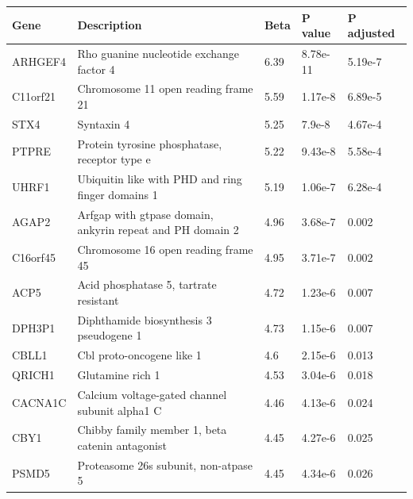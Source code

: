 \documentclass[10pt]{article}
\begin{document}
\begin{table}[]
\begin{tabular}{p{1.8cm}p{6.8cm}C{1cm}C{1.3cm}C{1.7cm}}
Gene     & Description                                                & Beta & P value & P adjusted \\
\hline
ARHGEF4  & Rho guanine nucleotide exchange factor 4                   & 6.39          & 8.78e-11      & 5.19e-7        \\
C11orf21 & Chromosome 11 open reading frame 21                        & 5.59          & 1.17e-8       & 6.89e-5        \\
STX4     & Syntaxin 4                                                 & 5.25          & 7.9e-8        & 4.67e-4        \\
PTPRE    & Protein tyrosine phosphatase, receptor type e              & 5.22          & 9.43e-8       & 5.58e-4        \\
UHRF1    & Ubiquitin like with PHD and ring finger domains 1          & 5.19          & 1.06e-7       & 6.28e-4        \\
AGAP2    & Arfgap with gtpase domain, ankyrin repeat and PH domain 2  & 4.96          & 3.68e-7       & 0.002          \\
C16orf45 & Chromosome 16 open reading frame 45                        & 4.95          & 3.71e-7       & 0.002          \\
ACP5     & Acid phosphatase 5, tartrate resistant                     & 4.72          & 1.23e-6       & 0.007          \\
DPH3P1   & Diphthamide biosynthesis 3 pseudogene 1                    & 4.73          & 1.15e-6       & 0.007          \\
CBLL1    & Cbl proto-oncogene like 1                                  & 4.6           & 2.15e-6       & 0.013          \\
QRICH1   & Glutamine rich 1                                           & 4.53          & 3.04e-6       & 0.018          \\
CACNA1C  & Calcium voltage-gated channel subunit alpha1 C             & 4.46          & 4.13e-6       & 0.024          \\
CBY1     & Chibby family member 1, beta catenin antagonist            & 4.45          & 4.27e-6       & 0.025          \\
PSMD5    & Proteasome 26s subunit, non-atpase 5                       & 4.45          & 4.34e-6       & 0.026          \\

\end{tabular}
\end{table}
\end{document}
